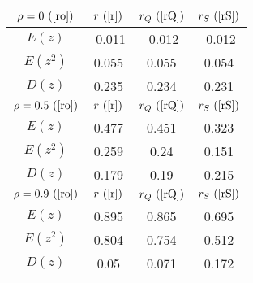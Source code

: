 \begin{tabular}{|c|c|c|c|}
\hline
$\rho = 0~(
\ref{ro})$ & $r ~(
\ref{r})$ & $r_Q ~(
\ref{rQ})$ & $r_S ~(
\ref{rS})$\\
\hline
$E(z)$ & -0.011 & -0.012 & -0.012\\
\hline
$E(z^2)$ & 0.055 & 0.055 & 0.054\\
\hline
$D(z)$ & 0.235 & 0.234 & 0.231\\
\hline
$\rho = 0.5~(
\ref{ro})$ & $r ~(
\ref{r})$ & $r_Q ~(
\ref{rQ})$ & $r_S ~(
\ref{rS})$\\
\hline
$E(z)$ & 0.477 & 0.451 & 0.323\\
\hline
$E(z^2)$ & 0.259 & 0.24 & 0.151\\
\hline
$D(z)$ & 0.179 & 0.19 & 0.215\\
\hline
$\rho = 0.9~(
\ref{ro})$ & $r ~(
\ref{r})$ & $r_Q ~(
\ref{rQ})$ & $r_S ~(
\ref{rS})$\\
\hline
$E(z)$ & 0.895 & 0.865 & 0.695\\
\hline
$E(z^2)$ & 0.804 & 0.754 & 0.512\\
\hline
$D(z)$ & 0.05 & 0.071 & 0.172\\
\hline
\end{tabular}